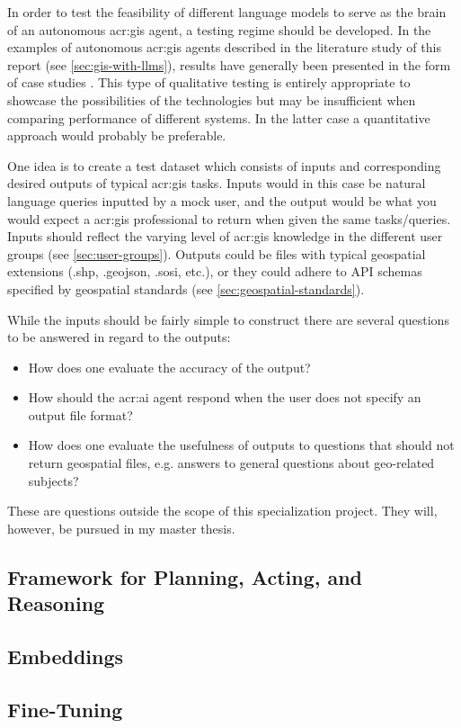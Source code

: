 In order to test the feasibility of different language models to serve as the brain of an autonomous \acrshort{acr:gis} agent, a testing regime should be developed. In the examples of autonomous \acrshort{acr:gis} agents described in the literature study of this report (see \autoref{sec:gis-with-llms}), results have generally been presented in the form of case studies \citep{liAutonomousGISNextgeneration2023,zhangGeoGPTUnderstandingProcessing2023}. This type of qualitative testing is entirely appropriate to showcase the possibilities of the technologies but may be insufficient when comparing performance of different systems. In the latter case a quantitative approach would probably be preferable.

One idea is to create a test dataset which consists of inputs and corresponding desired outputs of typical \acrshort{acr:gis} tasks. Inputs would in this case be natural language queries inputted by a mock user, and the output would be what you would expect a \acrshort{acr:gis} professional to return when given the same tasks/queries. Inputs should reflect the varying level of \acrshort{acr:gis} knowledge in the different user groups (see \autoref{sec:user-groups}). Outputs could be files with typical geospatial extensions (.shp, .geojson, .sosi, etc.), or they could adhere to API schemas specified by geospatial standards (see \autoref{sec:geospatial-standards}).

While the inputs should be fairly simple to construct there are several questions to be answered in regard to the outputs:

\begin{itemize}
    \item How does one evaluate the accuracy of the output?
    \item How should the \acrshort{acr:ai} agent respond when the user does not specify an output file format?
    \item How does one evaluate the usefulness of outputs to questions that should not return geospatial files, e.g. answers to general questions about geo-related subjects?
\end{itemize}

These are questions outside the scope of this specialization project. They will, however, be pursued in my master thesis.


\subsection{Framework for Planning, Acting, and Reasoning}
\subsection{Embeddings}
\subsection{Fine-Tuning}


\glsaddall